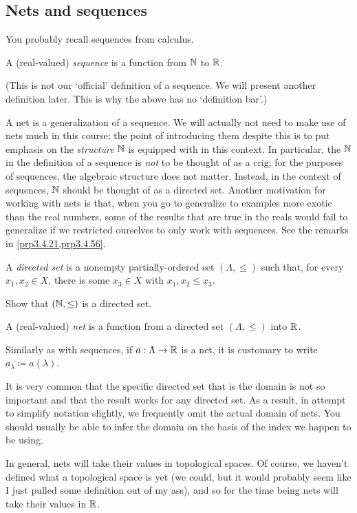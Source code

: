 \subsection{Nets and sequences}

You probably recall sequences from calculus.
\begin{textequation}
A (real-valued) \emph{sequence} is a function from $\mathbb{N}$ to $\mathbb{R}$.
\end{textequation}
(This is not our `official' definition of a sequence.  We will present another definition later.  This is why the above has no `definition bar'.)

A net is a generalization of a sequence.  We will actually not need to make use of nets much in this course; the point of introducing them despite this is to put emphasis on the \emph{structure} $\mathbb{N}$ is equipped with in this context.  In particular, the $\mathbb{N}$ in the definition of a sequence is \emph{not} to be thought of as a crig; for the purposes of sequences, the algebraic structure does not matter.  Instead, in the context of sequences, $\mathbb{N}$ should be thought of as a directed set.  Another motivation for working with nets is that, when you go to generalize to examples more exotic than the real numbers, some of the results that are true in the reals would fail to generalize if we restricted ourselves to only work with sequences.  See the remarks in \cref{prp3.4.21,prp3.4.56}.
\begin{dfn}\label{dfn3.3.2}
A \emph{directed set} is a nonempty partially-ordered set $(\Lambda ,\leq )$ such that, for every $x_1,x_2\in X$, there is some $x_3\in X$ with $x_1,x_2\leq x_3$.
\end{dfn}
\begin{exr}
Show that $(\mathbb{N} ,\leq )$ is a directed set.
\end{exr}
\begin{dfn}[Net]
A (real-valued) \emph{net} is a function from a directed set $(\Lambda ,\leq )$ into $\mathbb{R}$.
\begin{rmk}
Similarly as with sequences, if $a:\Lambda \rightarrow \mathbb{R}$ is a net, it is customary to write $a_\lambda \coloneqq a(\lambda )$.
\end{rmk}
\begin{rmk}
It is very common that the specific directed set that is the domain is not so important and that the result works for any directed set.  As a result, in attempt to simplify notation slightly, we frequently omit the actual domain of nets.  You should usually be able to infer the domain on the basis of the index we happen to be using.
\end{rmk}
\begin{rmk}
In general, nets will take their values in topological spaces.  Of course, we haven't defined what a topological space is yet (we could, but it would probably seem like I just pulled some definition out of my ass), and so for the time being nets will take their values in $\mathbb{R}$.
\end{rmk}
\end{dfn}
